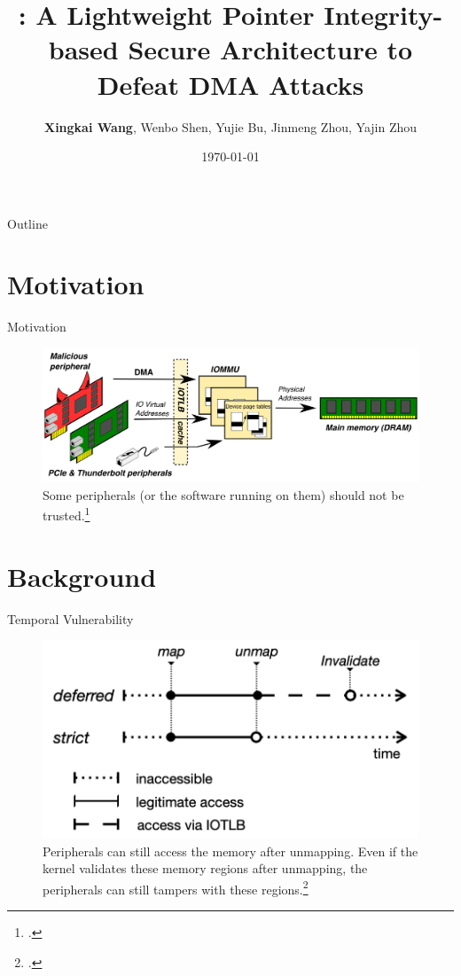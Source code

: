 \documentclass[10pt,aspectratio=169,mathserif]{beamer}
\title{\name: A Lightweight Pointer Integrity-based Secure Architecture to Defeat DMA Attacks}
\author{\textbf{Xingkai Wang}, Wenbo Shen, Yujie Bu, Jinmeng Zhou, Yajin Zhou}
\institute{Zhejiang University}
\date{\today{}}
\begin{document}
\begin{frame}
	\titlepage
\end{frame}

\begin{frame}{Outline}
	\tableofcontents
\end{frame}

\section{Motivation}
\begin{frame}{Motivation}
	\begin{figure}
		\centering
		\includegraphics[width=\linewidth]{./images/motivation.png}
		\caption{Some peripherals (or the software running on them) should not be trusted.\footcite{thunderclap}}
	\end{figure}
\end{frame}

\section{Background}

\begin{frame}{Temporal Vulnerability}
	\begin{figure}
		\centering
		\includegraphics[width=0.6\linewidth]{./images/temporal.png}
		\caption{Peripherals can still access the memory after unmapping. Even if the kernel validates these memory regions after unmapping, the peripherals can still tampers with these regions.\footcite{char}}
	\end{figure}
\end{frame}
\end{document}
